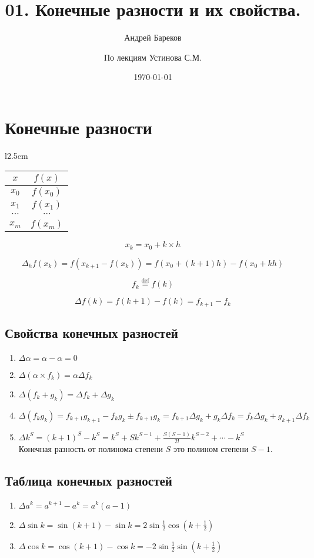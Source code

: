 \documentclass[a4paper,11pt]{article}
\title{01. Конечные разности и их свойства.}
\author{Андрей Бареков \and По лекциям Устинова С.М.}
\date{\today}
\begin{document}
\maketitle
\newpage

\section{Конечные разности}
\begin{wraptable}{l}{2.5cm}
  \begin{tabular}{ c|c }
    $x$ & $f(x)$ \\
    \hline
    $x_0$ & $f(x_0)$ \\
    $x_1$ & $f(x_1)$ \\
    $\cdots$ & $\cdots$ \\
    $x_m$ & $f(x_m)$
  \end{tabular}
  \vspace{3mm}
  \[x_k = x_0 + k \times h\]
\end{wraptable}

\[\Delta_h f(x_k) = f(x_{k+1} - f(x_k)) = f(x_0 + (k+1)h) - f(x_0 + kh)\]

\begin{center}
  \[f_k \stackrel{\mathrm{def}}{=} f(k)\]
\end{center}

\[\Delta f(k) = f(k+1) - f(k) = f_{k+1} - f_k\]

  \subsection{Свойства конечных разностей}
  \begin{enumerate}
    \item \(\Delta \alpha = \alpha - \alpha = 0\)
    \item \(\Delta (\alpha \times f_k) = \alpha \Delta f_k\)
    \item \(\Delta (f_k + g_k) = \Delta f_k + \Delta g_k\)
    \item \(\Delta (f_k g_k) = f_{k+1} g_{k+1} - f_k g_k \pm f_{k+1} g_k
        = f_{k+1} \Delta g_k + g_k \Delta f_k = f_k \Delta g_k + g_{k+1} \Delta f_k\)
    \item \(\Delta k^S = (k+1)^S - k^S = k^S + Sk^{S-1} + \frac{S(S-1)}{2!}k^{S-2} + \cdots - k^S\) \\
        Конечная разность от полинома степени $S$ это полином степени $S-1$.
  \end{enumerate}

  \subsection{Таблица конечных разностей}
  \begin{enumerate}
    \item \(\Delta a^k = a^{k+1} - a^k = a^k(a-1)\)
    \item \(\Delta \sin{k} = \sin{(k+1)} - \sin{k} = 2\sin{\frac{1}{2}}\cos{(k+\frac{1}{2})} \)
    \item \(\Delta \cos{k} = \cos{(k+1)} - \cos{k} = -2\sin{\frac{1}{2}}\sin{(k+\frac{1}{2})} \)
  \end{enumerate}
\newpage
\end{document}
